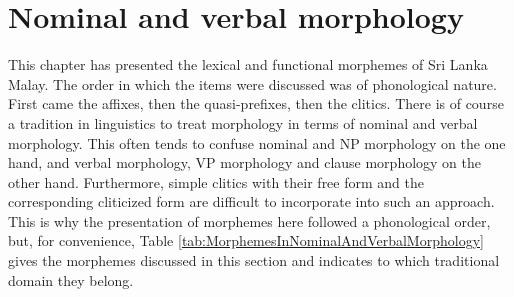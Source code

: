 


\section{Nominal and verbal morphology}\label{sec:morph:Nominalandverbalmorphology}
This chapter has presented the lexical and functional morphemes of Sri Lanka Malay. The order in which the items were discussed was of phonological nature. First came the affixes, then the quasi-prefixes, then the clitics. There is of course a tradition in linguistics to treat morphology in terms of nominal and verbal morphology. This often tends to confuse nominal and NP morphology on the one hand, and verbal morphology, VP morphology and clause morphology on the other hand. Furthermore, simple clitics with their free form and the corresponding cliticized form are difficult to incorporate into such an approach. This is why the presentation of morphemes here followed a phonological order, but, for convenience, Table \ref{tab:MorphemesInNominalAndVerbalMorphology} gives the morphemes discussed in this section and indicates to which traditional domain they belong.

